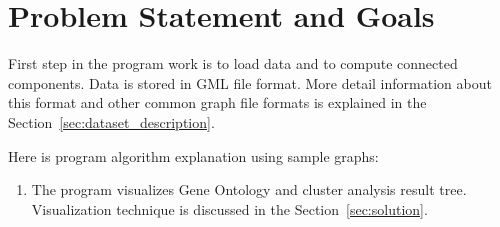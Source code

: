 \section{Problem Statement and Goals}
\label{sec:problem}
First step in the program work is to load data and to compute connected components. Data is stored in GML file format. More detail information about this format and other common graph file formats is explained in the Section~\ref{sec:dataset_description}.

Here is program algorithm explanation using sample graphs:
\begin{enumerate}

\item The program visualizes Gene Ontology and cluster analysis result tree. Visualization technique is discussed in the Section~\ref{sec:solution}.


\end{enumerate}

